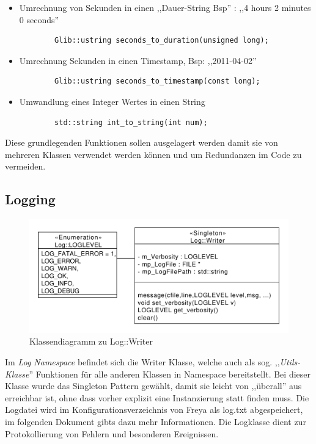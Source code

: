 \begin{itemize}
    \item Umrechnung von Sekunden in einen ,,Dauer-String Bsp'' : ,,4 hours 2 minutes 0 seconds''

        \begin{verbatim}
        Glib::ustring seconds_to_duration(unsigned long);
        \end{verbatim}

    \item Umrechnung Sekunden in einen Timestamp, Bsp: ,,2011-04-02''
        \begin{verbatim}
        Glib::ustring seconds_to_timestamp(const long);
        \end{verbatim}

    \item Umwandlung eines Integer Wertes in einen String
        \begin{verbatim}
        std::string int_to_string(int num);
        \end{verbatim}
\end{itemize}


Diese grundlegenden Funktionen sollen ausgelagert werden damit sie von mehreren Klassen verwendet werden können und um Redundanzen im 
Code zu vermeiden.

\subsection{Logging}
\begin{figure}[htb!]
    \centering
    \includegraphics[scale=0.6]{./gfx/class/log}
    \caption{Klassendiagramm zu Log::Writer}
    \label{c_log}
\end{figure}
Im \emph{Log Namespace} befindet sich die Writer Klasse, welche auch als sog. ,,\textit{Utils-Klasse}'' Funktionen für alle anderen
Klassen in Namespace bereitstellt. Bei dieser Klasse wurde das Singleton Pattern gewählt, damit sie leicht von ,,überall'' aus erreichbar ist, ohne dass vorher explizit eine Instanzierung statt finden muss. Die Logdatei wird im Konfigurationsverzeichnis von Freya als log.txt
abgespeichert, im folgenden Dokument gibts dazu mehr Informationen. 
Die Logklasse dient zur Protokollierung von Fehlern und besonderen Ereignissen.  

